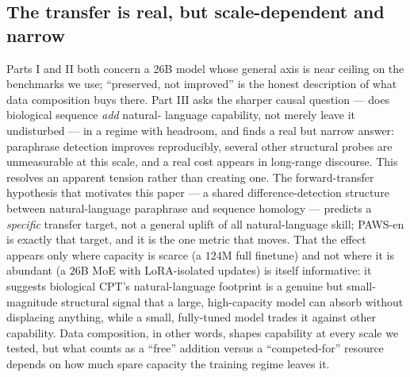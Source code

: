 \subsection{The transfer is real, but scale-dependent and narrow}
Parts I and II both concern a 26B model whose general axis is near ceiling on the benchmarks we
use; ``preserved, not improved'' is the honest description of what data composition buys there.
Part III asks the sharper causal question --- does biological sequence \emph{add} natural-
language capability, not merely leave it undisturbed --- in a regime with headroom, and finds a
real but narrow answer: paraphrase detection improves reproducibly, several other structural
probes are unmeasurable at this scale, and a real cost appears in long-range discourse. This
resolves an apparent tension rather than creating one. The forward-transfer hypothesis that
motivates this paper --- a shared difference-detection structure between natural-language
paraphrase and sequence homology --- predicts a \emph{specific} transfer target, not a general
uplift of all natural-language skill; PAWS-en is exactly that target, and it is the one metric
that moves. That the effect appears only where capacity is scarce (a $124$M full finetune) and
not where it is abundant (a $26$B MoE with LoRA-isolated updates) is itself informative: it
suggests biological CPT's natural-language footprint is a genuine but small-magnitude structural
signal that a large, high-capacity model can absorb without displacing anything, while a small,
fully-tuned model trades it against other capability. Data composition, in other words, shapes
capability at every scale we tested, but what counts as a ``free'' addition versus a
``competed-for'' resource depends on how much spare capacity the training regime leaves it.

